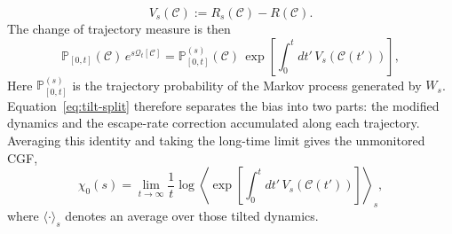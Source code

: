 \documentclass[11pt]{article}
\begin{document}
\[
    V_s(\mathcal{C}):=R_s(\mathcal{C})-R(\mathcal{C}).
\]
The change of trajectory measure is then
\begin{equation}
    \mathbb{P}_{\left[0,t\right]}\left(\mathcal{C}\right)\, e^{s\mathcal{Q}_t[\mathcal{C}]}
    = \mathbb{P}^{(s)}_{\left[0,t\right]}\left(\mathcal{C}\right) \,
      \exp\left[\int_0^t dt'\,
        V_s\!\left(\mathcal{C}(t')\right)\right],
    \label{eq:tilt-split}
\end{equation}
Here $\mathbb{P}^{(s)}_{\left[0,t\right]}$ is the trajectory probability of the Markov process generated by $W_s$. Equation~\ref{eq:tilt-split} therefore separates the bias into two parts: the modified dynamics and the escape-rate correction accumulated along each trajectory. Averaging this identity and taking the long-time limit gives the unmonitored CGF,
\begin{equation}
    \chi_0(s) = \lim_{t \to \infty} \frac{1}{t} \log \left\langle
    \exp\left[\int_0^t dt'\,
    V_s\!\left(\mathcal{C}(t')\right)\right]
    \right\rangle_{\!s},
    \label{eq:cgf-tilted}
\end{equation}
where $\langle\cdot\rangle_s$ denotes an average over those tilted dynamics.
\end{document}
